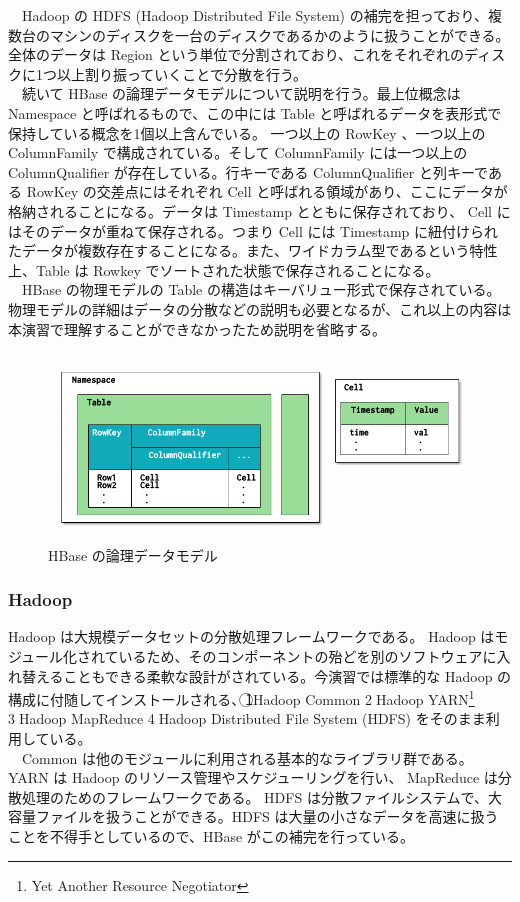\documentclass[dvipdfmx]{scrartcl}
\begin{document}
　Hadoop の HDFS (Hadoop Distributed File System) の補完を担っており、複数台のマシンのディスクを一台のディスクであるかのように扱うことができる。全体のデータは Region という単位で分割されており、これをそれぞれのディスクに1つ以上割り振っていくことで分散を行う。\\
　続いて HBase の論理データモデルについて説明を行う。最上位概念は Namespace と呼ばれるもので、この中には Table と呼ばれるデータを表形式で保持している概念を1個以上含んでいる。 一つ以上の RowKey 、一つ以上の ColumnFamily で構成されている。そして ColumnFamily には一つ以上の ColumnQualifier が存在している。行キーである ColumnQualifier と列キーである RowKey の交差点にはそれぞれ Cell と呼ばれる領域があり、ここにデータが格納されることになる。データは Timestamp とともに保存されており、 Cell にはそのデータが重ねて保存される。つまり Cell には Timestamp に紐付けられたデータが複数存在することになる。また、ワイドカラム型であるという特性上、Table は Rowkey でソートされた状態で保存されることになる。\\
　HBase の物理モデルの Table の構造はキーバリュー形式で保存されている。物理モデルの詳細はデータの分散などの説明も必要となるが、これ以上の内容は本演習で理解することができなかったため説明を省略する。\\

\begin{figure}[htbp]
\centering
\includegraphics[width=.9\linewidth]{hoge2.png}
\caption{HBase の論理データモデル}
\end{figure}

\subsubsection{Hadoop}
\label{sec:org2ef4051}
Hadoop は大規模データセットの分散処理フレームワークである。 Hadoop はモジュール化されているため、そのコンポーネントの殆どを別のソフトウェアに入れ替えることもできる柔軟な設計がされている。今演習では標準的な Hadoop の構成に付随してインストールされる、\textcircled{\scriptsize 1}Hadoop Common \textcircled{\scriptsize 2}Hadoop YARN\footnote{Yet Another Resource Negotiator} \textcircled{\scriptsize 3}Hadoop MapReduce \textcircled{\scriptsize 4}Hadoop Distributed File System (HDFS) をそのまま利用している。\\
　Common は他のモジュールに利用される基本的なライブラリ群である。 YARN は Hadoop のリソース管理やスケジューリングを行い、 MapReduce は分散処理のためのフレームワークである。 HDFS は分散ファイルシステムで、大容量ファイルを扱うことができる。HDFS は大量の小さなデータを高速に扱うことを不得手としているので、HBase がこの補完を行っている。\\
\end{document}
